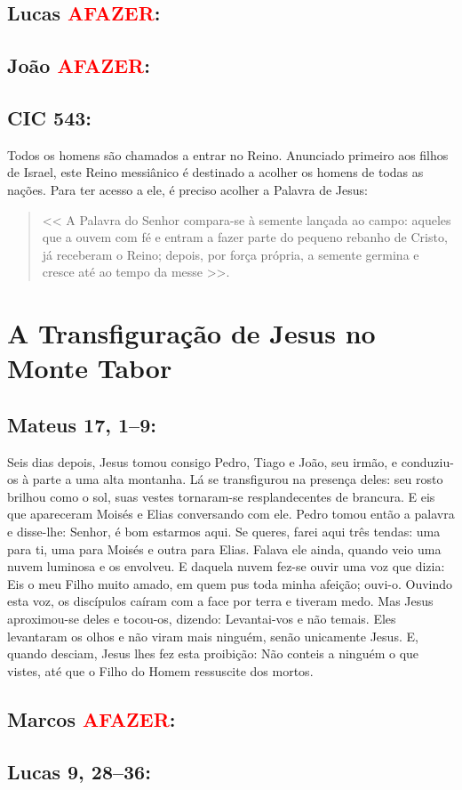 \documentclass[10pt,a5paper]{book}
\newcommand{\from}[1]{\subsection*{#1}}
\newcommand{\TODO}{\textcolor{red}{\ttfamily AFAZER}}
\begin{document}
\from{Lucas \TODO:}

\from{João \TODO:}

\from{CIC 543:}

Todos os homens são chamados a entrar no Reino.
Anunciado primeiro aos filhos de Israel, este Reino messiânico é destinado a acolher os homens de todas as nações.
Para ter acesso a ele, é preciso acolher a Palavra de Jesus:
\begin{quote}
<< A Palavra do Senhor compara-se à semente lançada ao campo:
aqueles que a ouvem com fé e entram a fazer parte do pequeno rebanho de Cristo, já receberam o Reino;
depois, por força própria, a semente germina e cresce até ao tempo da messe >>.
\end{quote}


\section{A Transfiguração de Jesus no Monte Tabor}

\from{Mateus 17, 1--9:}

Seis dias depois, Jesus tomou consigo Pedro, Tiago e João, seu irmão, e conduziu-os à parte a uma alta montanha.
Lá se transfigurou na presença deles: seu rosto brilhou como o sol, suas vestes tornaram-se resplandecentes de brancura.
E eis que apareceram Moisés e Elias conversando com ele.
Pedro tomou então a palavra e disse-lhe:
Senhor, é bom estarmos aqui. Se queres, farei aqui três tendas:
uma para ti, uma para Moisés e outra para Elias.
Falava ele ainda, quando veio uma nuvem luminosa e os envolveu.
E daquela nuvem fez-se ouvir uma voz que dizia:
Eis o meu Filho muito amado, em quem pus toda minha afeição; ouvi-o.
Ouvindo esta voz, os discípulos caíram com a face por terra e tiveram medo.
Mas Jesus aproximou-se deles e tocou-os, dizendo:
Levantai-vos e não temais.
Eles levantaram os olhos e não viram mais ninguém, senão unicamente Jesus.
E, quando desciam, Jesus lhes fez esta proibição:
Não conteis a ninguém o que vistes, até que o Filho do Homem ressuscite dos mortos.

\from{Marcos \TODO:}

\from{Lucas 9, 28--36:}
\end{document}
